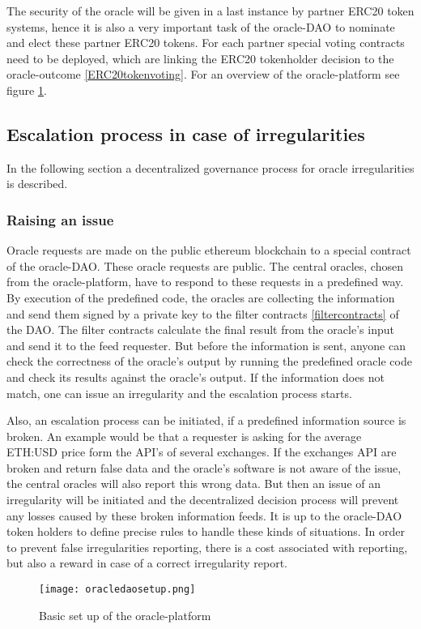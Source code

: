 \documentclass[a4paper]{article}
\begin{document}
The security of the oracle will be given in a last instance by partner ERC20 token systems, hence it is also a very important task of the oracle-DAO to nominate and elect these partner ERC20 tokens. For each partner special voting contracts need to be deployed, which are linking the ERC20 tokenholder decision to the oracle-outcome \ref{ERC20tokenvoting}. For an overview of the oracle-platform see figure \ref{fig:oracledaosetup}.

\subsection{Escalation process in case of irregularities}
In the following section a decentralized governance process for oracle irregularities is described.
\subsubsection{Raising an issue}
Oracle requests are made on the public ethereum blockchain to a special contract of the oracle-DAO. These oracle requests are public. The central oracles, chosen from the oracle-platform, have to respond to these requests in a predefined way. By execution of the predefined code, the oracles are collecting the information and send them signed by a private key to the filter contracts \ref{filtercontracts} of the DAO. The filter contracts calculate the final result from the oracle's input and send it to the feed requester. But before the information is sent, anyone can check the correctness of the oracle's output by running the predefined oracle code and check its results against the oracle's output. If the information does not match, one can issue an irregularity and the escalation process starts.

Also, an escalation process can be initiated, if a predefined information source is broken. An example would be that a requester is asking for the average ETH:USD price form the API's of several exchanges. If the exchanges API are broken and return false data and the oracle's software is not aware of the issue, the central oracles will also report this wrong data. But then an issue of an irregularity will be initiated and the decentralized decision process will prevent any losses caused by these broken information feeds. It is up to the oracle-DAO token holders to define precise rules to handle these kinds of situations.
In order to prevent false irregularities reporting, there is a cost associated with reporting, but also a reward in case of a correct irregularity report.
 \begin{figure}
\centering
\texttt{[image: oracledaosetup.png]}
\caption{\label{fig:oracledaosetup}Basic set up of the oracle-platform}
\end{figure}
\end{document}
